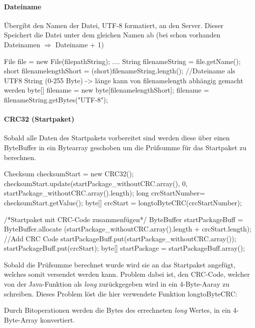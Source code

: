 \documentclass[a4paper, 12pt]{scrartcl}
\begin{document}
\paragraph{Dateiname}
Übergibt den Namen der Datei, UTF-8 formatiert, an den Server. Dieser Speichert die Datei unter dem gleichen Namen ab (bei schon vorhanden Dateinamen $\Rightarrow$ Dateiname + 1)
\begin{javacode}
File file = new File(filepathString);
....
String filenameString = file.getName(); 
short filenamelengthShort = (short)filenameString.length();
//Dateiname als UTF8 String (0-255 Byte) -> länge kann von filenamelength abhängig gemacht werden
byte[] filename = new byte[filenamelengthShort];
filename = filenameString.getBytes("UTF-8");
\end{javacode}
\paragraph{CRC32 (Startpaket)}
Sobald alle Daten des Startpakets vorbereitet sind werden diese über einen ByteBuffer in ein Bytearray geschoben um die Prüfsumme für das Startpaket zu berechnen.
\begin{javacode}
Checksum checksumStart = new CRC32();
checksumStart.update(startPackage_withoutCRC.array(), 
	0, startPackage_withoutCRC.array().length);
long crcStartNumber= checksumStart.getValue();
byte[] crcStart = longtoByteCRC(crcStartNumber);
	    	
/*Startpaket mit CRC-Code zusammenfügen*/
ByteBuffer startPackageBuff = ByteBuffer.allocate
		(startPackage_withoutCRC.array().length + crcStart.length);
//Add CRC Code 
startPackageBuff.put(startPackage_withoutCRC.array());
startPackageBuff.put(crcStart);
byte[] startPackage = startPackageBuff.array();
\end{javacode}
Sobald die Prüfsumme berechnet wurde wird sie an das Startpaket angefügt, welches somit versendet werden kann.
Problem dabei ist, den CRC-Code, welcher von der Java-Funktion als \textit{long} zurückgegeben wird in ein 4-Byte-Aaray zu schreiben.
Dieses Problem löst die hier verwendete Funktion longtoByteCRC:
Durch Bitoperationen werden die Bytes des errechneten \textit{long} Wertes, in ein 4-Byte-Array konvertiert.
\end{document}
